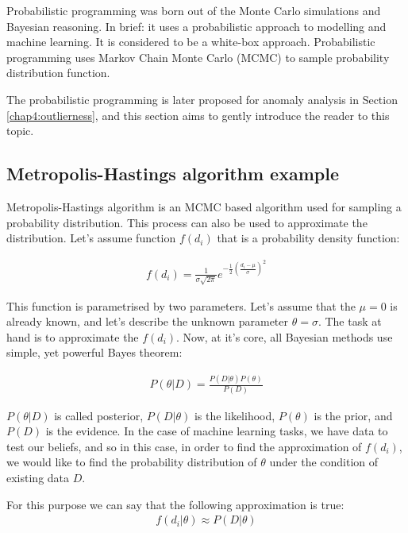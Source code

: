 Probabilistic programming \cite{davidsonpilon2015probabilistic} was born out of the Monte Carlo simulations and Bayesian reasoning. In brief: it uses a probabilistic approach to modelling and machine learning.
It is considered to be a white-box approach.
Probabilistic programming uses Markov Chain Monte Carlo (MCMC) to sample probability distribution function.

The probabilistic programming is later proposed for anomaly analysis in Section \ref{chap4:outlierness}, and this section aims to gently introduce the reader to this topic.



\subsection{Metropolis-Hastings algorithm example}

Metropolis-Hastings algorithm  \cite{Robert2004} is an MCMC based algorithm used for sampling a probability distribution.
This process can also be used to approximate the distribution.
Let's assume function $f(d_{i})$ that is a probability density function:

\begin{align}
f(d_{i}) = \frac{1}{\sigma \sqrt{2\pi} } e^{-\frac{1}{2}\left(\frac{d_{i}-\mu}{\sigma}\right)^2}
  \end{align}

This function is parametrised by two parameters.
Let's assume that the $\mu = 0$ is already known, and let's describe the unknown parameter $\theta = \sigma$.
The task at hand is to approximate the $f(d_i)$.
Now, at it's core, all Bayesian methods use simple, yet powerful Bayes theorem:

\begin{align}
  P(\theta|D) = \frac{P(D|\theta)P(\theta)}{P(D)}
\end{align}

$P(\theta|D)$ is called posterior, $P(D|\theta)$ is the likelihood, $P(\theta)$ is the prior, and $P(D)$ is the evidence.
In the case of machine learning tasks, we have data to test our beliefs, and so in this case, in order to find the approximation of $f(d_{i})$, we would like to find the probability distribution of $\theta$ under the condition of existing data $D$.

For this purpose we can say that the following approximation is true:
\begin{align}
f(d_{i} | \theta) \approx P(D|\theta)
  \end{align}

